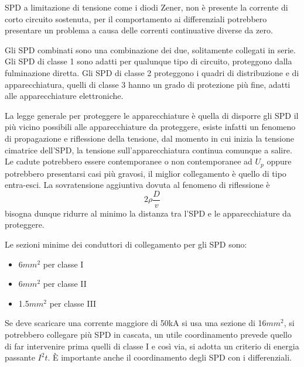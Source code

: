 SPD a limitazione di tensione come i diodi Zener, non è presente la corrente di corto circuito sostenuta, per il comportamento ai differenziali potrebbero presentare un problema a causa delle correnti continuative diverse da zero.

Gli SPD combinati sono una combinazione dei due, solitamente collegati in serie.
Gli SPD di classe 1 sono adatti per qualunque tipo di circuito, proteggono 
dalla fulminazione diretta. Gli SPD di classe 2 proteggono i quadri di 
distribuzione e di apparecchiatura, quelli di classe 3 hanno un grado di 
protezione più fine, adatti alle apparecchiature elettroniche.

La legge generale per proteggere le apparecchiature è quella di disporre gli 
SPD il più vicino possibili alle apparecchiature da proteggere, esiste infatti 
un fenomeno di propagazione e riflessione della tensione, dal momento in cui 
inizia la tensione cimatrice dell'SPD, la tensione sull'apparecchiatura 
continua comunque a salire.
Le cadute potrebbero essere contemporanee o non contemporanee ad $U_p$ oppure potrebbero presentarsi casi più gravosi, il miglior collegamento è quello di tipo entra-esci.
La sovratensione aggiuntiva dovuta al fenomeno di riflessione è 
$$
2\rho \frac{D}{v}
$$
bisogna dunque ridurre al minimo la distanza tra l'SPD e le apparecchiature da proteggere.

Le sezioni minime dei conduttori di collegamento per gli SPD sono:
\begin{itemize}
    \item 6$mm^2$ per classe I
    \item 6$mm^2$ per classe II 
    \item 1.5$mm^2$ per classe III
\end{itemize}
Se deve scaricare una corrente maggiore di 50kA si usa una sezione di 16$mm^2$, si potrebbero collegare più SPD in cascata, un utile coordinamento prevede quello di far intervenire prima quelli di classe I e così via, si adotta un criterio di energia passante $I^2t$.
È importante anche il coordinamento degli SPD con i differenziali.

